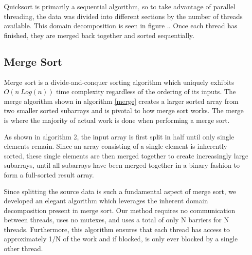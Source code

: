 \documentclass[journal]{IEEEtran}
\begin{document}
Quicksort is primarily a sequential algorithm, so to take advantage of parallel threading, the data was divided into different sections by the number of threads available.  This domain decomposition is seen in figure ..  Once each thread has finished, they are merged back together and sorted sequentially. 


%		
%			
%			


%
%    
%


\subsection{Merge Sort}
Merge sort is a divide-and-conquer sorting algorithm which uniquely exhibits $O(n\ Log(n))$ time complexity regardless of the ordering of its inputs.  The merge algorithm shown in algorithm \ref{merge} creates a larger sorted array from two smaller sorted subarrays and is pivotal to how merge sort works.  The merge is where the majority of actual work is done when performing a merge sort.   

As shown in algorithm 2, the input array is first split in half until only single elements remain.  Since an array consisting of a single element is inherently sorted, these single elements are then merged together to create increasingly large subarrays, until all subarrays have been merged together in a binary fashion to form a full-sorted result array.

Since splitting the source data is such a fundamental aspect of merge sort, we developed an elegant algorithm which leverages the inherent domain decomposition present in merge sort.  Our method requires no communication between threads, uses no mutexes, and uses a total of only N barriers for N threads.  Furthermore, this algorithm ensures that each thread has access to approximately 1/N of the work and if blocked, is only ever blocked by a single other thread.  
\end{document}
